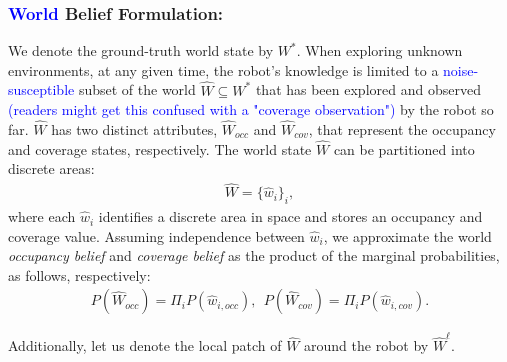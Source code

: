 \documentclass[letterpaper]{article} %
\begin{document}
\subsubsection{\textcolor{blue}{World} Belief Formulation:} \hfill
\vspace{-0.25pt}

\noindent
We denote the ground-truth world state by $W^*$. When exploring unknown environments, at any given time, the robot's knowledge is limited to a \textcolor{blue}{noise-susceptible} subset of the  world $\hat{W}\!\!\subseteq\! W^*$ that has been explored and observed \textcolor{blue}{(readers might get this confused with a "coverage observation")} by the robot so far.
$\hat{W}$ has two distinct attributes, $\hat{W}_{occ}$ and $\hat{W}_{cov}$, that represent the occupancy and coverage states, respectively. The world state $\hat{W}$ can be partitioned into discrete areas: 
\begin{align}
  \hat{W} = \{\hat{w}_i\}_i,
\end{align}
where each $\hat{w}_i$ identifies a discrete area in space and stores an occupancy and coverage value. 
Assuming independence between $\hat{w}_i$, we approximate the world \textit{occupancy belief} and \textit{coverage belief} as the product of the marginal probabilities, as follows, respectively:
\begin{align}
  \!P(\hat{W}_{occ}) = \Pi_i P(\hat{w}_{i,occ}),~~
  P(\hat{W}_{cov}) = \Pi_i P(\hat{w}_{i,cov}). 
  \label{eq:coverage_belief}
\end{align}

Additionally, let us denote the local patch of $\hat{W}$ around the robot by $\hat{W}^\ell$.
%
%
\end{document}
